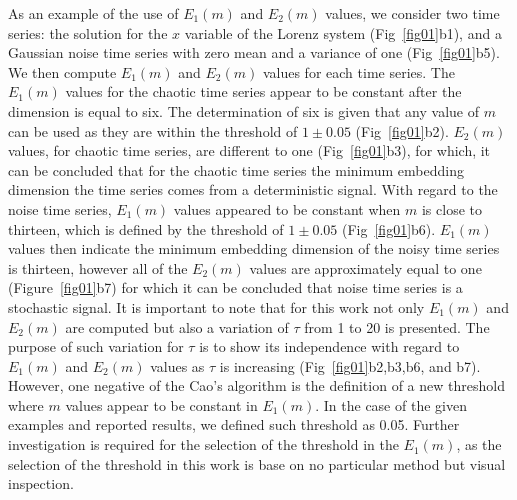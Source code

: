 \documentclass[fleqn,10pt]{wlscirep}
\begin{document}
As an example of the use of $E_1(m)$ and $E_2(m)$ values, we consider two time series: the solution for the $x$ variable of the Lorenz system (Fig~\ref{fig01}b1), and a Gaussian noise time series with zero mean and a variance of one (Fig~\ref{fig01}b5).
We then compute $E_1(m)$ and $E_2(m)$ values for each time series.
The $E_1(m)$ values for the chaotic time series appear to be constant after the dimension is equal to six.
The determination of six is given that any value of $m$ can be used as they are within the threshold of $1\pm0.05$ (Fig~\ref{fig01}b2).
$E_2(m)$ values, for chaotic time series, are different to one (Fig~\ref{fig01}b3), for which, it can be concluded that for the chaotic time series the minimum embedding dimension the time series comes from a deterministic signal. With regard to the noise time series, $E_1(m)$ values appeared to be constant when $m$ is close to thirteen, which is defined by the threshold of $1\pm0.05$ (Fig~\ref{fig01}b6).
$E_1(m)$ values then indicate the minimum embedding dimension of the noisy time series is thirteen, however all of the $E_2(m)$ values are approximately equal to one (Figure~\ref{fig01}b7) for which it can be concluded that noise time series is a stochastic signal.
It is important to note that for this work not only $E_1(m)$ and $E_2(m)$ are computed but also a variation of $\tau$ from 1 to 20 is presented.
The purpose of such variation for $\tau$ is to show its independence with regard to $E_1(m)$ and $E_2(m)$ values as $\tau$ is increasing (Fig~\ref{fig01}b2,b3,b6, and b7).
However, one negative of the Cao's algorithm \cite{Cao1997} is the definition of a new threshold where $m$ values appear to be constant in $E_1 (m)$.
In the case of the given examples and reported results, we defined such threshold as 0.05.
Further investigation is required for the selection of the threshold in the $E_1(m)$, as the selection of the threshold in this work is base on no particular method but visual inspection.

\end{document}
